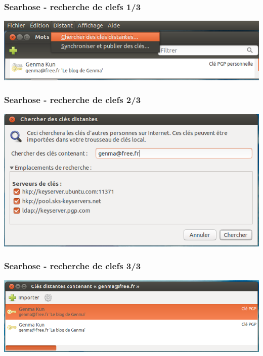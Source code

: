 \documentclass{beamer}
\begin{document}
\begin{frame}
\frametitle{Searhose - recherche de clefs 1/3}
\begin{center}
\includegraphics[scale=0.3] {./images/Seahorse_chercherclef01.png}
\end{center}
\begin{itemize}
\end{itemize}
\end{frame}

\begin{frame}
\frametitle{Searhose - recherche de clefs 2/3}
\begin{center}
\includegraphics[scale=0.3] {./images/Seahorse_chercherclef02.png}
\end{center}
\end{frame}

\begin{frame}
\frametitle{Searhose - recherche de clefs 3/3}
\begin{center}
\includegraphics[scale=0.3] {./images/Seahorse_chercherclef03.png}
\end{center}
\begin{itemize}
\end{itemize}
\end{frame}
\end{document}
